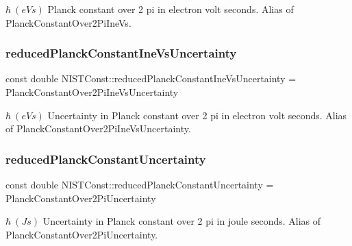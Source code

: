 $\hbar \ (eV s)$ Planck constant over 2 pi in electron volt seconds. Alias of Planck\+Constant\+Over2\+Pi\+Ine\+Vs. \mbox{\label{group___planck_constant_ga90ccf5a0925f9ffdf8c289a7f2155482}} 
\subsubsection{\texorpdfstring{reduced\+Planck\+Constant\+Ine\+Vs\+Uncertainty}{reducedPlanckConstantIneVsUncertainty}}
{\footnotesize\ttfamily const double N\+I\+S\+T\+Const\+::reduced\+Planck\+Constant\+Ine\+Vs\+Uncertainty = Planck\+Constant\+Over2\+Pi\+Ine\+Vs\+Uncertainty}

$\hbar \ (eV s)$ Uncertainty in Planck constant over 2 pi in electron volt seconds. Alias of Planck\+Constant\+Over2\+Pi\+Ine\+Vs\+Uncertainty. \mbox{\label{group___planck_constant_ga723312692d243868ce31c9ac7172cab9}} 
\subsubsection{\texorpdfstring{reduced\+Planck\+Constant\+Uncertainty}{reducedPlanckConstantUncertainty}}
{\footnotesize\ttfamily const double N\+I\+S\+T\+Const\+::reduced\+Planck\+Constant\+Uncertainty = Planck\+Constant\+Over2\+Pi\+Uncertainty}

$\hbar \ (J s)$ Uncertainty in Planck constant over 2 pi in joule seconds. Alias of Planck\+Constant\+Over2\+Pi\+Uncertainty. 
